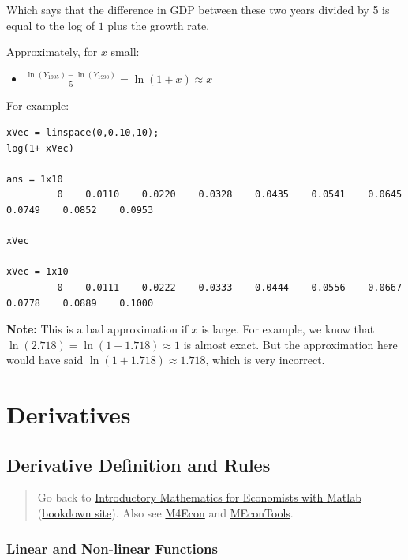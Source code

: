 \documentclass[
]{book}
\providecommand{\tightlist}{%
  \setlength{\itemsep}{0pt}\setlength{\parskip}{0pt}}
\begin{document}
Which says that the difference in GDP between these two years divided by
5 is equal to the log of \(1\) plus the growth rate.

Approximately, for \(x\) small:

\begin{itemize}
\tightlist
\item
  \(\displaystyle \frac{\ln (Y_{1995} )-\ln (Y_{1990} )}{5}=\ln (1+x)\approx x\)
\end{itemize}

For example:

\begin{verbatim}
xVec = linspace(0,0.10,10);
log(1+ xVec)

ans = 1x10    
         0    0.0110    0.0220    0.0328    0.0435    0.0541    0.0645    0.0749    0.0852    0.0953

xVec

xVec = 1x10    
         0    0.0111    0.0222    0.0333    0.0444    0.0556    0.0667    0.0778    0.0889    0.1000
\end{verbatim}

\textbf{Note:} This is a bad approximation if \(x\) is large. For example, we
know that \(\ln (2.718)=\ln (1+1.718)\approx 1\) is almost exact. But the
approximation here would have said \(\ln (1+1.718)\approx 1.718\), which
is very incorrect.

\hypertarget{derivatives}{%
\chapter{Derivatives}\label{derivatives}}

\hypertarget{derivative-definition-and-rules}{%
\section{Derivative Definition and Rules}\label{derivative-definition-and-rules}}

\begin{quote}
Go back to \href{https://math4econ.github.io/}{Introductory Mathematics for Economists with Matlab} (\href{https://math4econ.github.io/bookdown}{bookdown site}). Also see \href{http://fanwangecon.github.io/M4Econ}{M4Econ} and \href{https://fanwangecon.github.io/MEconTools/}{MEconTools}.
\end{quote}

\hypertarget{linear-and-non-linear-functions}{%
\subsection{Linear and Non-linear Functions}\label{linear-and-non-linear-functions}}
\end{document}
